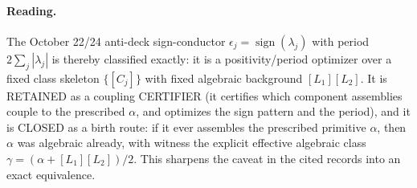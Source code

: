 \documentclass[11pt]{article}
\begin{document}
\paragraph{Reading.}
The October 22/24 anti-deck sign-conductor
$\epsilon_j=\operatorname{sign}(\lambda_j)$ with period
$2\sum_j|\lambda_j|$ is thereby classified exactly: it is a
positivity/period optimizer over a fixed class skeleton
$\{[C_j]\}$ with fixed algebraic background $[L_1][L_2]$. It is
RETAINED as a coupling CERTIFIER (it certifies which component
assemblies couple to the prescribed $\alpha$, and optimizes the sign
pattern and the period), and it is CLOSED as a birth route: if it ever
assembles the prescribed primitive $\alpha$, then $\alpha$ was
algebraic already, with witness the explicit effective algebraic class
$\gamma=(\alpha+[L_1][L_2])/2$. This sharpens the caveat in the cited
records into an exact equivalence.
\end{document}
